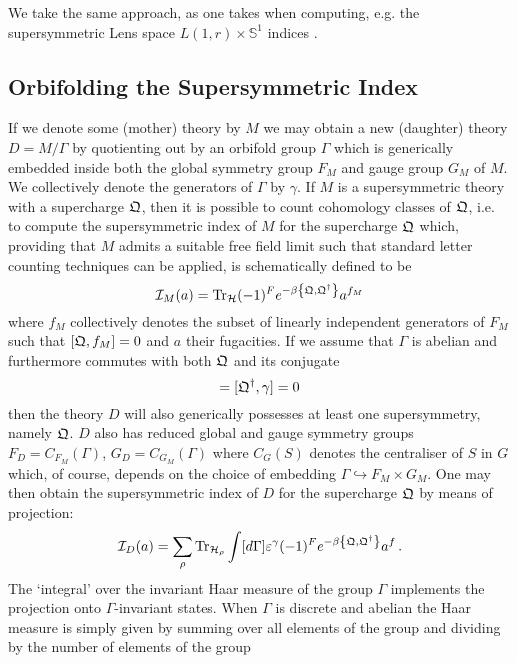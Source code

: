 \documentclass[main.tex]{subfiles}
\begin{document}
We take the same approach, as one takes when computing, e.g. the supersymmetric Lens space $L(1,r)\times \mathbb{S}^1$ indices \cite{Benini:2011nc,Razamat:2013jxa,Razamat:2013opa,Alday:2013rs,Hikida:2006qb}.

\subsection{Orbifolding the Supersymmetric Index}\label{subsec:orbindex}
If we denote some (mother) theory by $M$ we may obtain a new (daughter) theory $D=M/\Gamma$ by quotienting out by an orbifold group $\Gamma$ which is generically embedded inside both the global symmetry group $F_M$ and gauge group $G_M$ of $M$. We collectively denote the generators of $\Gamma$ by $\gamma$. If $M$ is a supersymmetric theory with a supercharge $\mathfrak{Q}$, then it is possible to count cohomology classes of $\mathfrak{Q}$, i.e. to compute the supersymmetric index of $M$ for the supercharge $\mathfrak{Q}$ which, providing that $M$ admits a suitable free field limit such that standard letter counting techniques can be applied, is schematically defined to be
\begin{equation}
\mathcal{I}_M(a)=\operatorname{Tr}_{\mathcal{H}}(-1)^Fe^{-\beta\left\{\mathfrak{Q},\mathfrak{Q}^{\dagger}\right\}}a^{f_M}
\end{equation}
where $f_M$ collectively denotes the subset of linearly independent generators of $F_M$ such that $\left[\mathfrak{Q},f_M\right]=0$ and $a$ their fugacities.
If we assume that $\Gamma$ is abelian and furthermore commutes with both $\mathfrak{Q}$ and its conjugate 
\begin{equation}
[\QBRST,\gamma]=[\QBRST^{\dagger},\gamma]=0
\end{equation}
then the theory $D$ will also generically possesses at least one supersymmetry, namely $\mathfrak{Q}$. $D$ also has reduced global and gauge symmetry groups $F_D=C_{F_M}\left(\Gamma\right)$, $G_D=C_{G_M}\left(\Gamma\right)$ where $C_{G}(S)$ denotes the centraliser of $S$ in $G$ which, of course, depends on the choice of embedding $\Gamma\hookrightarrow F_M\times G_M$.
One may then obtain the supersymmetric index of $D$ for the supercharge $\mathfrak{Q}$ by means of projection:
\begin{equation}\label{eqn:ID}
\mathcal{I}_D(a)=\sum_{\rho}\operatorname{Tr}_{\mathcal{H}_{\rho}}\int[d\Gamma]\varepsilon^{\gamma}(-1)^Fe^{-\beta\left\{\mathfrak{Q},\mathfrak{Q}^{\dagger}\right\}}a^f\,.
\end{equation}
The `integral' over the invariant Haar measure of the group $\Gamma$ implements the projection onto $\Gamma$-invariant states. When $\Gamma$ is discrete and abelian the Haar measure is simply given by summing over all elements of the group and dividing by the number of elements of the group
\end{document}
